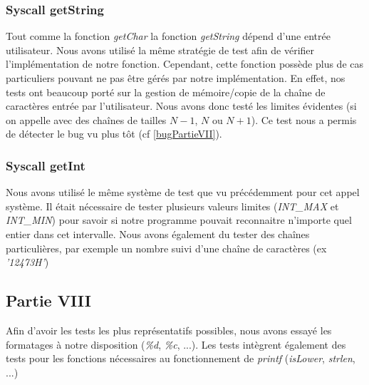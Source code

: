 \documentclass{article}
\begin{document}
\subsubsection{Syscall getString}
Tout comme la fonction \textit{getChar} la fonction \textit{getString} dépend
d'une entrée utilisateur. Nous avons utilisé la même stratégie de test afin de
vérifier l'implémentation de notre fonction. Cependant, cette fonction possède
plus de cas particuliers pouvant ne pas être gérés par notre implémentation. En
effet, nos tests ont beaucoup porté sur la gestion de mémoire/copie de la
chaîne de caractères entrée par l'utilisateur. Nous avons donc testé les
limites évidentes (si on appelle avec des chaînes de tailles $N-1$, $N$ ou
$N+1$). Ce test nous a permis de détecter le bug vu plus tôt (cf
\ref{bugPartieVII}).
\subsubsection{Syscall getInt}
Nous avons utilisé le même système de test que vu précédemment pour cet appel système.
Il était nécessaire de tester plusieurs valeurs limites (\textit{INT\_MAX} et \textit{INT\_MIN}) pour
savoir si notre programme pouvait reconnaitre n'importe quel entier dans cet intervalle. Nous avons également
du tester des chaînes particulières, par exemple un nombre suivi d'une chaîne de caractères (ex \textit{'12473H'})

\subsection{Partie VIII}
Afin d'avoir les tests les plus représentatifs possibles, nous avons essayé les formatages à notre disposition (\textit{\%d}, \textit{\%c}, ...).
Les tests intègrent également des tests pour les fonctions nécessaires au fonctionnement de \textit{printf} (\textit{isLower}, \textit{strlen}, ...)
\end{document}
